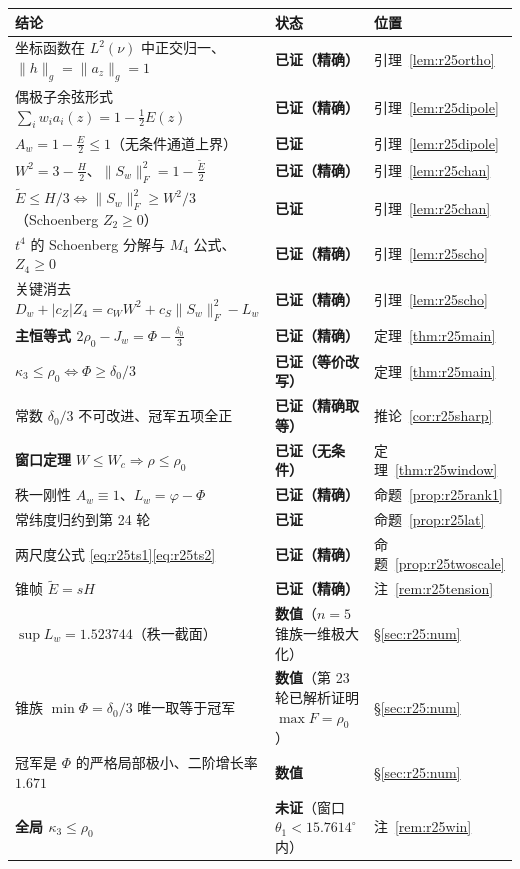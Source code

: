 \begin{center}\small
\begin{tabular}{lll}
\toprule
结论 & 状态 & 位置\\
\midrule
坐标函数在 $L^2(\nu)$ 中正交归一、$\|h\|_g=\|a_z\|_g=1$ & \textbf{已证（精确）} & 引理~\ref{lem:r25ortho}\\
偶极子余弦形式 $\sum_iw_ia_i(z)=1-\frac12E(z)$ & \textbf{已证（精确）} & 引理~\ref{lem:r25dipole}\\
\textbf{$A_w=1-\frac E2\le1$}（无条件通道上界） & \textbf{已证} & 引理~\ref{lem:r25dipole}\\
$W^2=3-\frac H2$、$\|S_w\|_F^2=1-\frac{\widetilde E}2$ & \textbf{已证（精确）} & 引理~\ref{lem:r25chan}\\
$\widetilde E\le H/3\iff\|S_w\|_F^2\ge W^2/3$（Schoenberg $Z_2\ge0$） & \textbf{已证} & 引理~\ref{lem:r25chan}\\
$t^4$ 的 Schoenberg 分解与 $M_4$ 公式、$Z_4\ge0$ & \textbf{已证（精确）} & 引理~\ref{lem:r25scho}\\
关键消去 $D_w+|c_Z|Z_4=c_WW^2+c_S\|S_w\|_F^2-L_w$ & \textbf{已证（精确）} & 引理~\ref{lem:r25scho}\\
\textbf{主恒等式 $2\rho_0-J_w=\Phi-\frac{\delta_0}3$} & \textbf{已证（精确）} & 定理~\ref{thm:r25main}\\
$\kappa_3\le\rho_0\iff\Phi\ge\delta_0/3$ & \textbf{已证（等价改写）} & 定理~\ref{thm:r25main}\\
常数 $\delta_0/3$ 不可改进、冠军五项全正 & \textbf{已证（精确取等）} & 推论~\ref{cor:r25sharp}\\
\textbf{窗口定理} $W\le W_c\Rightarrow\rho\le\rho_0$ & \textbf{已证（无条件）} & 定理~\ref{thm:r25window}\\
秩一刚性 $A_w\equiv1$、$L_w=\varphi-\Phi$ & \textbf{已证（精确）} & 命题~\ref{prop:r25rank1}\\
常纬度归约到第 24 轮 & \textbf{已证} & 命题~\ref{prop:r25lat}\\
两尺度公式 \eqref{eq:r25ts1}\eqref{eq:r25ts2} & \textbf{已证（精确）} & 命题~\ref{prop:r25twoscale}\\
锥帧 $\widetilde E=sH$ & \textbf{已证（精确）} & 注~\ref{rem:r25tension}\\
$\sup L_w=1.523744$（秩一截面） & \textbf{数值}（$n=5$ 锥族一维极大化） & \S\ref{sec:r25:num}\\
锥族 $\min\Phi=\delta_0/3$ 唯一取等于冠军 & \textbf{数值}（第 23 轮已解析证明 $\max F=\rho_0$） & \S\ref{sec:r25:num}\\
冠军是 $\Phi$ 的严格局部极小、二阶增长率 $1.671$ & \textbf{数值} & \S\ref{sec:r25:num}\\
\textbf{全局 $\kappa_3\le\rho_0$} & \textbf{未证}（窗口 $\theta_1<15.7614^\circ$ 内） & 注~\ref{rem:r25win}\\
\bottomrule
\end{tabular}
\end{center}

